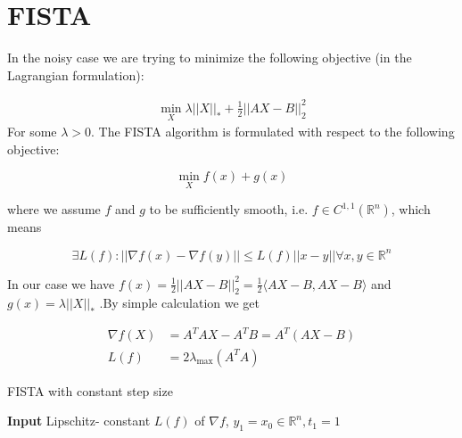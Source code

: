 \documentclass{article}
\numberwithin{equation}{section}
\begin{document}
\section{FISTA}

In the noisy case we are trying to minimize the following objective (in the Lagrangian formulation):

\begin{align}
\min_X \lambda||X||_*  + \frac{1}{2} ||AX - B||_2^2
\label{fista_objective}
\end{align}
For some $\lambda > 0$.
The FISTA algorithm is formulated with respect to the following objective:

$$\min_X f(x) + g(x)$$

where we assume $f$ and $g$ to be sufficiently smooth, i.e. $f \in C^{1,1}(\mathbb{R}^n)$, which means

$$\exists L(f) : ||\nabla f(x) - \nabla f(y)|| \leq L(f)||x - y|| \forall x,y \in \mathbb{R}^n$$

In our case we have $f(x) = \frac{1}{2} ||AX - B||_2^2 = \frac{1}{2}\langle AX - B, AX - B \rangle$ and $g(x) =  \lambda||X||_*$ .By simple calculation we get 

\begin{align}
\nabla f(X) &= A^TAX - A^TB = A^T(AX - B) \label{nabla_eq}
\\
L(f) &= 2\lambda_{\max}(A^TA)
\end{align}


\begin{algorithm}[H]
\caption{FISTA with constant step size}
\hspace*{\algorithmicindent} \textbf{Input} Lipschitz- constant $L(f)$ of $\nabla f$, $y_1 = x_0 \in \mathbb{R}^n, t_1=1$
\begin{algorithmic}[1]
\EndFor
\end{algorithmic}
\end{algorithm}
\end{document}

